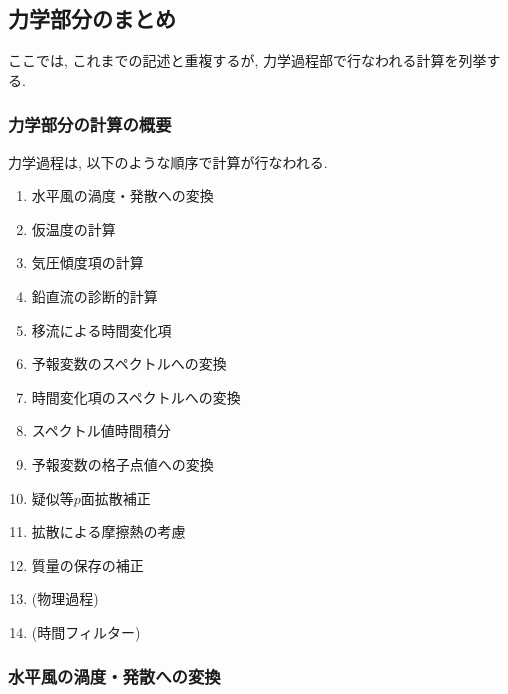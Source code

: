﻿
\subsection{力学部分のまとめ}

ここでは, これまでの記述と重複するが,
力学過程部で行なわれる計算を列挙する.

\subsubsection{力学部分の計算の概要}

力学過程は, 以下のような順序で計算が行なわれる.

\begin{enumerate}
\item 水平風の渦度・発散への変換   
\item 仮温度の計算              
\item 気圧傾度項の計算           
\item 鉛直流の診断的計算         
\item 移流による時間変化項 
\item 予報変数のスペクトルへの変換 
\item 時間変化項のスペクトルへの変換 
\item スペクトル値時間積分 
\item 予報変数の格子点値への変換 
\item 疑似等$p$面拡散補正   
\item 拡散による摩擦熱の考慮    
\item 質量の保存の補正          
\item (物理過程)             
\item (時間フィルター)        
\end{enumerate}

\subsubsection{水平風の渦度・発散への変換}

